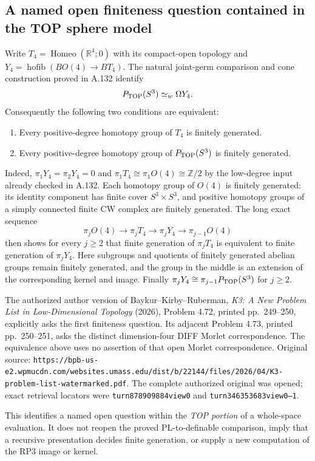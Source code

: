 \subsection*{A named open finiteness question contained in the TOP sphere model}

Write $T_4=\operatorname{Homeo}(\mathbb R^4;0)$ with its
compact-open topology and $Y_4=\operatorname{hofib}(BO(4)\to BT_4)$.
The natural joint-germ comparison and cone construction proved in
A.132 identify
\[
                    P_{\rm TOP}(S^3)\simeq_w\Omega Y_4.
\]
Consequently the following two conditions are equivalent:
\begin{enumerate}
\item Every positive-degree homotopy group of $T_4$ is finitely generated.
\item Every positive-degree homotopy group of $P_{\rm TOP}(S^3)$ is
finitely generated.
\end{enumerate}

Indeed, $\pi_1Y_4=\pi_2Y_4=0$ and
$\pi_1T_4\cong\pi_1O(4)\cong\mathbb Z/2$ by the low-degree input
already checked in A.132. Each homotopy group of $O(4)$ is finitely
generated: its identity component has finite cover $S^3\times S^3$,
and positive homotopy groups of a simply connected finite CW complex
are finitely generated. The long exact sequence
\[
 \pi_jO(4)\longrightarrow\pi_jT_4\longrightarrow\pi_jY_4
     \longrightarrow\pi_{j-1}O(4)
\]
then shows for every $j\ge2$ that finite generation of $\pi_jT_4$
is equivalent to finite generation of $\pi_jY_4$. Here subgroups
and quotients of finitely generated abelian groups remain finitely
generated, and the group in the middle is an extension of the
corresponding kernel and image. Finally
$\pi_jY_4\cong\pi_{j-1}P_{\rm TOP}(S^3)$ for $j\ge2$.

The authorized author version of Baykur--Kirby--Ruberman,
\emph{K3: A New Problem List in Low-Dimensional Topology} (2026),
Problem 4.72, printed pp.~249--250, explicitly asks the first
finiteness question. Its adjacent Problem 4.73, printed pp.~250--251,
asks the distinct dimension-four DIFF Morlet correspondence. The
equivalence above uses no assertion of that open Morlet correspondence.
Original source: \texttt{https://bpb-us-e2.wpmucdn.com/websites.umass.edu/dist/b/22144/files/2026/04/K3-problem-list-watermarked.pdf}.
The complete authorized original was opened; exact retrieval locators
were \texttt{turn878909884view0} and
\texttt{turn346353683view0--1}.

This identifies a named open question within the \emph{TOP portion}
of a whole-space evaluation. It does not reopen the proved PL-to-definable
comparison, imply that a recursive presentation decides finite generation,
or supply a new computation of the RP3 image or kernel.
